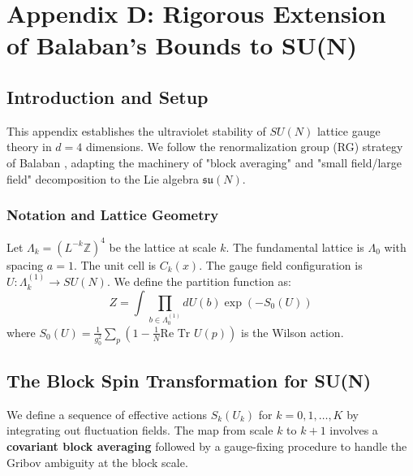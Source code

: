 \chapter{Appendix D: Rigorous Extension of Balaban's Bounds to SU(N)}
\label{app:appendix_D_balaban_sun}

\section{Introduction and Setup}

This appendix establishes the ultraviolet stability of $SU(N)$ lattice gauge theory in $d=4$ dimensions. We follow the renormalization group (RG) strategy of Balaban \cite{balaban1987renormalization}, adapting the machinery of "block averaging" and "small field/large field" decomposition to the Lie algebra $\mathfrak{su}(N)$.

\subsection{Notation and Lattice Geometry}

Let $\Lambda_k = (L^{-k} \mathbb{Z})^4$ be the lattice at scale $k$. The fundamental lattice is $\Lambda_0$ with spacing $a=1$. The unit cell is $C_k(x)$.
The gauge field configuration is $U: \Lambda_k^{(1)} \to SU(N)$.
We define the partition function as:
\begin{equation}
Z = \int \prod_{b \in \Lambda_0^{(1)}} dU(b) \exp(-S_0(U))
\end{equation}
where $S_0(U) = \frac{1}{g_0^2} \sum_p (1 - \frac{1}{N} \text{Re Tr } U(p))$ is the Wilson action.

\section{The Block Spin Transformation for SU(N)}

We define a sequence of effective actions $S_k(U_k)$ for $k=0, 1, \dots, K$ by integrating out fluctuation fields. The map from scale $k$ to $k+1$ involves a \textbf{covariant block averaging} followed by a gauge-fixing procedure to handle the Gribov ambiguity at the block scale.

